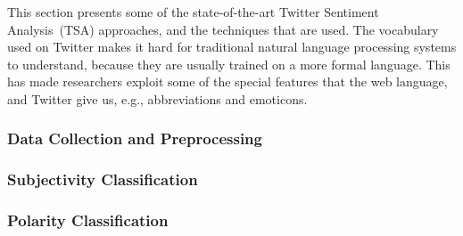 This section presents some of the state-of-the-art Twitter Sentiment Analysis~(TSA) approaches, and the techniques that are used. The vocabulary used on Twitter makes it hard for traditional natural language processing systems to understand, because they are usually trained on a more formal language. This has made researchers exploit some of the special features that the web language, and Twitter give us, e.g., abbreviations and emoticons.
	
		\subsubsection{Data Collection and Preprocessing}
		
		
		\subsubsection{Subjectivity Classification}
		
		
		\subsubsection{Polarity Classification}
		